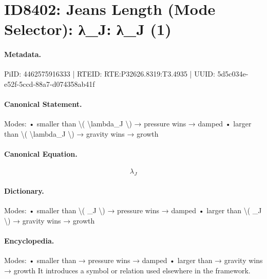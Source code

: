 \section*{ID8402: Jeans Length (Mode Selector): λ\_J: λ\_J (1)}
\paragraph{Metadata.}
PiID: 4462575916333 | RTEID: RTE:P32626.8319:T3.4935 | UUID: 5d5c034e-e52f-5ccd-88a7-d074358ab41f

\paragraph{Canonical Statement.}
Modes: • smaller than \textbackslash{}( \textbackslash{}lambda\_J \textbackslash{}) → pressure wins → damped • larger than \textbackslash{}( \textbackslash{}lambda\_J \textbackslash{}) → gravity wins → growth

\paragraph{Canonical Equation.}
\[
\lambda_J
\]

\paragraph{Dictionary.}
Modes: • smaller than \textbackslash{}( \_J \textbackslash{}) → pressure wins → damped • larger than \textbackslash{}( \_J \textbackslash{}) → gravity wins → growth

\paragraph{Encyclopedia.}
Modes: • smaller than → pressure wins → damped • larger than → gravity wins → growth It introduces a symbol or relation used elsewhere in the framework.
